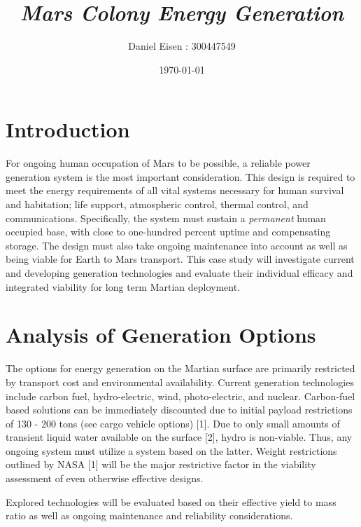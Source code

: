 \documentclass[12pt]{IEEEtran}
\title{\textit{Mars Colony Energy Generation}}
\author{Daniel Eisen : 300447549}
\date{\today}
\begin{document}
\maketitle
\section{Introduction}
For ongoing human occupation of Mars to be possible, a reliable power generation system is the most important consideration. This design is required to meet the energy requirements of all vital systems necessary for human survival and habitation; life support, atmospheric control, thermal control, and communications. Specifically, the system must sustain a \textit{permanent} human occupied base, with close to one-hundred percent uptime and compensating storage. The design must also take ongoing maintenance into account as well as being viable for Earth to Mars transport. This case study will investigate current and developing generation technologies and evaluate their individual efficacy and integrated viability for long term Martian deployment.

\section{Analysis of Generation Options}
The options for energy generation on the Martian surface are primarily restricted by transport cost and environmental availability. Current generation technologies include carbon fuel, hydro-electric, wind, photo-electric, and nuclear. Carbon-fuel based solutions can be immediately discounted due to initial payload restrictions of 130 - 200 tons (see cargo vehicle options) [1]. Due to only small amounts of transient liquid water available on the surface [2], hydro is non-viable. Thus, any ongoing system must utilize a system based on the latter. Weight restrictions outlined by NASA [1] will be the major restrictive factor in the viability assessment of even otherwise effective designs.

Explored technologies will be evaluated based on their effective yield to mass ratio as well as ongoing maintenance and reliability considerations.
\end{document}
